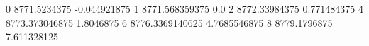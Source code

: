 0 8771.5234375 -0.044921875
1 8771.568359375 0.0
2 8772.33984375 0.771484375
4 8773.373046875 1.8046875
6 8776.3369140625 4.7685546875
8 8779.1796875 7.611328125
